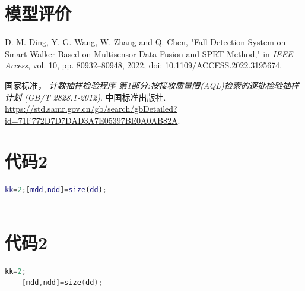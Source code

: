 \documentclass[withoutpreface,bwprint]{cumcmthesis} %
\begin{document}
\section{模型评价}

\begin{thebibliography}{9}%
	D.-M. Ding, Y.-G. Wang, W. Zhang and Q. Chen, "Fall Detection System on Smart Walker Based on Multisensor Data Fusion and SPRT Method," in
	\emph{IEEE Access}, vol. 10, pp. 80932--80948, 2022, doi: 10.1109/ACCESS.2022.3195674.


	国家标准，
	\textit{计数抽样检验程序 第1部分:按接收质量限(AQL)检索的逐批检验抽样计划 (GB/T 2828.1-2012)}. 中国标准出版社.
	\url{https://std.samr.gov.cn/gb/search/gbDetailed?id=71F772D7D7DAD3A7E05397BE0A0AB82A}.

	\bibitem[3]{}

	\bibitem[4]{}

	\bibitem[5]{}

\end{thebibliography}

\newpage
\begin{appendices}
	\section{代码2}

	\begin{lstlisting}[language=matlab]
	kk=2;[mdd,ndd]=size(dd);
	 
	 \end{lstlisting}

	\section{代码2}

	\begin{lstlisting}[language=c]
	kk=2;
	[mdd,ndd]=size(dd);
	 \end{lstlisting}
\end{appendices}
\end{document}
